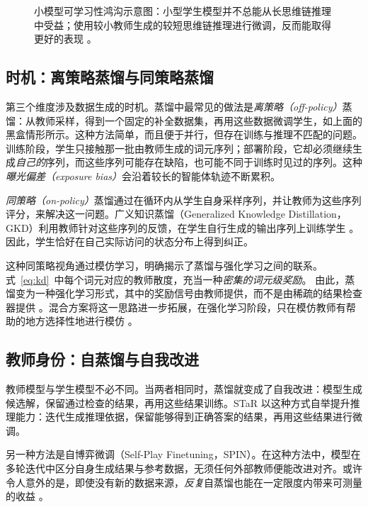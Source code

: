 \begin{figure}[tb]
    \centering
    
    \caption{小模型可学习性鸿沟示意图：小型学生模型并不总能从长思维链推理中受益；使用较小教师生成的较短思维链推理进行微调，反而能取得更好的表现 \citep{li-etal-2025-small-models}。}
    \label{fig:small-model-learnability}
\end{figure}

\subsection{时机：离策略蒸馏与同策略蒸馏}
第三个维度涉及数据生成的时机。蒸馏中最常见的做法是{\em 离策略（off-policy）}蒸馏：从教师采样，得到一个固定的补全数据集，再用这些数据微调学生，如上面的黑盒情形所示。这种方法简单，而且便于并行，但存在训练与推理不匹配的问题。训练阶段，学生只接触那一批由教师生成的词元序列；部署阶段，它却必须继续生成{\em 自己的}序列，而这些序列可能存在缺陷，也可能不同于训练时见过的序列。这种{\em 曝光偏差（exposure bias）}会沿着较长的智能体轨迹不断累积。

{\em 同策略（on-policy）}蒸馏通过在循环内从学生自身采样序列，并让教师为这些序列评分，来解决这一问题。广义知识蒸馏（Generalized Knowledge Distillation，GKD）利用教师针对这些序列的反馈，在学生自行生成的输出序列上训练学生 \citep{agarwal2024policy}。因此，学生恰好在自己实际访问的状态分布上得到纠正。

这种同策略视角通过模仿学习，明确揭示了蒸馏与强化学习之间的联系。式~\ref{eq:kd}~中每个词元对应的教师散度，充当一种{\em 密集的词元级奖励}。
由此，蒸馏变为一种强化学习形式，其中的奖励信号由教师提供，而不是由稀疏的结果检查器提供 \citep{lu2025onpolicydistillation}。混合方案将这一思路进一步拓展，在强化学习阶段，只在模仿教师有帮助的地方选择性地进行模仿 \citep{zhang2026reinforcementaware}。

\subsection{教师身份：自蒸馏与自我改进}
教师模型与学生模型不必不同。当两者相同时，蒸馏就变成了自我改进：模型生成候选解，保留通过检查的结果，再用这些结果训练。STaR \citep{zelikman2022star} 以这种方式自举提升推理能力：迭代生成推理依据，保留能够得到正确答案的结果，再用这些结果进行微调。

另一种方法是自博弈微调（Self-Play Finetuning，SPIN）\citep{chen2024self}。在这种方法中，模型在多轮迭代中区分自身生成结果与参考数据，无须任何外部教师便能改进对齐。或许令人意外的是，即使没有新的数据来源，{\em 反复}自蒸馏也能在一定限度内带来可测量的收益 \citep{pareek2024understandinggainsrepeatedselfdistillation}。


